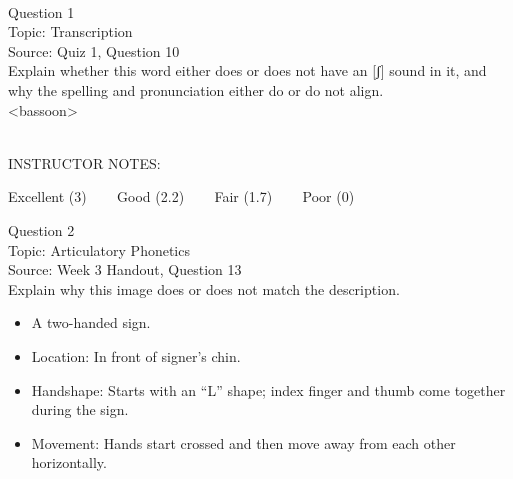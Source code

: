 \documentclass[12pt]{article}
\begin{document}
\begin{center}
\textbf{{\color{red}{\HUGE END OF EXAM}}}\\

\end{center}
\newpage

\begin{center}
\textbf{{\color{blue}{\HUGE START OF EXAM\\}}}

\textbf{{\color{blue}{\HUGE Student ID: 51191\\}}}

\textbf{{\color{blue}{\HUGE \\}}}

\end{center}
\newpage

{\large Question 1}\\

Topic: Transcription\\
Source: Quiz 1, Question 10\\

Explain whether this word either does or does not have an [ʃ] sound in it, and why the spelling and pronunciation either do or do not align.\\

<bassoon>


~\\
INSTRUCTOR NOTES: 


\vfill
Excellent (3) ~~~ Good (2.2) ~~~ Fair (1.7) ~~~ Poor (0)
\newpage

{\large Question 2}\\

Topic: Articulatory Phonetics\\
Source: Week 3 Handout, Question 13\\

Explain why this image does or does not match the description.\\

\begin{itemize} \item A two-handed sign. \item Location: In front of signer’s chin. \item Handshape: Starts with an “L” shape; index finger and thumb come together during the sign. \item Movement: Hands start crossed and then move away from each other horizontally. \end{itemize}
\end{document}
